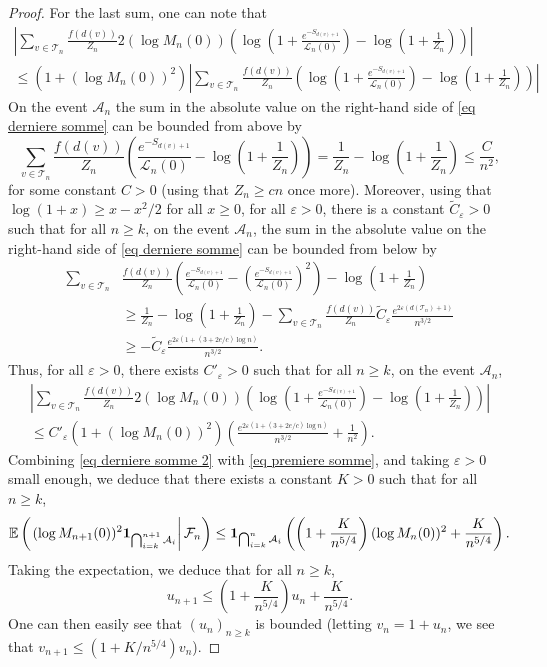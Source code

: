 \documentclass[10pt,a4paper]{amsart}
\def\E{\mathbb{E}}
\def \T{\mathcal{T}}
\def \cL{\mathcal{L}}
\def\vp{\varepsilon}
\begin{document}
\begin{proof}
	For the last sum, one can note that
	\begin{multline}\label{eq derniere somme}
		 \left\vert\sum_{v \in \T_n} \frac{f(d(v))}{Z_n}2(\log M_n(0))\left(\log \left(1+ \frac{e^{-S_{d(v)+1}} }{\cL_n(0)}\right) -\log\left(1+\frac{1}{Z_n}\right)\right) \right\vert \\ 
		 \le (1+ (\log M_n(0))^2 ) \left\vert \sum_{v \in \T_n} \frac{f(d(v))}{Z_n}\left(  \log \left(1+ \frac{e^{-S_{d(v)+1}} }{\cL_n(0)}\right) -\log\left(1+\frac{1}{Z_n}\right)\right) \right\vert 
	\end{multline}
	On the event $\mathcal{A}_n$ the sum in the absolute value on the right-hand side of \eqref{eq derniere somme} can be bounded from above by
	\[
	\sum_{v \in \T_n} \frac{f(d(v))}{Z_n} \left( \frac{e^{-S_{d(v)+1}}}{\cL_n(0)} - \log \left(1+\frac{1}{Z_n}\right)\right)= \frac{1}{Z_n} - \log \left(1+ \frac{1}{Z_n}\right) \le \frac{C}{n^2},
	\]
	for some constant $C>0$ (using that $Z_n \ge cn$ once more). Moreover, using that $\log(1+x) \ge x-x^2/2$ for all $x\ge 0$, for all $\vp>0$, there is a constant $\widetilde{C}_\vp>0$ such that for all $n\ge k$, on the event $\mathcal{A}_n$, the sum in the absolute value on the right-hand side of \eqref{eq derniere somme} can be bounded from below by
	\begin{align*}
	\sum_{v \in \T_n} &\frac{f(d(v))}{Z_n}\left( \frac{e^{-S_{d(v)+1}}}{\cL_n(0)} - \left(\frac{e^{-S_{d(v)+1}}}{\cL_n(0)} \right)^2 \right) - \log \left(1+\frac{1}{Z_n}\right)\\
	&\ge  \frac{1}{Z_n} - \log \left(1+ \frac{1}{Z_n}\right)  - \sum_{v \in \T_n} \frac{f(d(v))}{Z_n} \widetilde{C}_\vp \frac{e^{2\vp (d(\T_n)+1)}}{n^{3/2}} \\
	&\ge - \widetilde{C}_\vp \frac{e^{2\vp(1+(3+2e/c)\log n)}}{n^{3/2}}.
	\end{align*}
	Thus, for all $\vp>0$, there exists $C'_\vp>0$ such that for all $n\ge k$, on the event $\mathcal{A}_n$, 
	\begin{multline}\label{eq derniere somme 2}
		\left\vert\sum_{v \in \T_n} \frac{f(d(v))}{Z_n}2(\log M_n(0))\left(\log \left(1+ \frac{e^{-S_{d(v)+1}} }{\cL_n(0)}\right) -\log\left(1+\frac{1}{Z_n}\right)\right) \right\vert \\
		\le C'_\vp (1+ (\log M_n(0))^2) \left( \frac{e^{2\vp(1+(3+2e/c)\log n)}}{n^{3/2}} +  \frac{1}{n^2} \right).
	\end{multline}
	Combining \eqref{eq derniere somme 2} with \eqref{eq premiere somme}, and taking $\vp>0$ small enough, we deduce that there exists a constant $K>0$ such that for all $n\ge k$,
	\[
	\E\left(\left. (\log M_{n+1}(0))^2 {\bf 1}_{\bigcap_{i=k}^{n+1} \mathcal{A}_i} \right\vert \mathcal{F}_n\right)\le {\bf 1}_{\bigcap_{i=k}^n \mathcal{A}_i} \left( \left(1+ \frac{K}{n^{5/4}} \right) (\log M_n(0))^2 + \frac{K}{n^{5/4}} \right).
	\]
	Taking the expectation, we deduce that for all $n\ge k$,
	\[
	u_{n+1} \le \left(1 + \frac{K}{n^{5/4}}\right) u_n + \frac{K}{n^{5/4}}.
	\]
	One can then easily see that $(u_n)_{n\ge k}$ is bounded (letting $v_n = 1+u_n$, we see that $v_{n+1} \le (1+K/n^{5/4})v_n$).
	

\end{proof}
\end{document}
